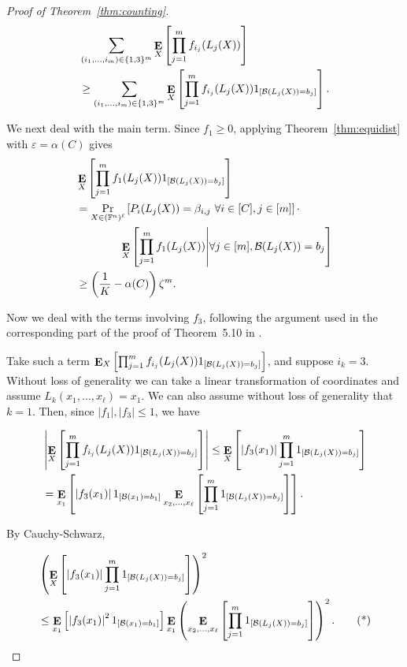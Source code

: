 \documentclass{article}
\theoremstyle{plain}
\theoremstyle{definition}
\theoremstyle{definition}
\theoremstyle{remark}
\numberwithin{equation}{section}
\newcommand{\FF}{\mathbb{F}}
\newcommand{\Esymb}{{\bf E}}
\DeclareMathOperator*{\E}{\Esymb}
\newcommand{\cB}{\mathcal B}
\begin{document}
\begin{proof}[Proof of Theorem~\ref{thm:counting}]
\begin{align*}
    & \sum_{(i_1,\dots,i_m)\in \{1,3\}^m}\E_{X}\left[\prod_{j=1}^m f_{i_j}(L_j(X))\right] \\
    & \geq\sum_{(i_1,\dots,i_m)\in \{1,3\}^m}\E_{X}\left[\prod_{j=1}^m f_{i_j}(L_j(X))1_{[\cB(L_j(X))=b_j]}\right].
\end{align*}

We next deal with the main term. Since $f_1\geq 0$, applying Theorem~\ref{thm:equidist} with $\varepsilon=\alpha(C)$ gives
\begin{align*}
    & \E_{X}\left[\prod_{j=1}^m f_{1}(L_j(X)) 1_{[\cB(L_j(X))=b_j]}\right] \\
    &= \Pr_{X\in (\FF^n)^\ell}\left[P_i(L_j(X)) = \beta_{i,j}~
 \forall i \in [C],j \in [m] \right]\cdot\\
 &\qquad \qquad \E_{X}\left[\prod_{j=1}^m f_{1}(L_j(X))\middle| \forall j\in[m], \cB(L_j(X))=b_j \right] \\
 &\geq \left(\frac{1}{K} - \alpha(C)\right) \zeta^m.
\end{align*}

Now we deal with the terms involving $f_3$, following the argument used in the corresponding part of the proof of Theorem~5.10 in \cite{VeryCountingMaybe}.

Take such a term $\E_{X}\left[\prod_{j=1}^m f_{i_j}(L_j(X))1_{[\cB(L_j(X))=b_j]}\right]$, and suppose $i_k=3$. Without loss of generality we can take a linear transformation of coordinates and assume $L_k(x_1,\dots,x_\ell)=x_1$. We can also assume without loss of generality that $k=1$. Then, since $|f_1|,|f_3|\leq 1$, we have

\begin{align*}
    &\left|\E_{X}\left[\prod_{j=1}^m f_{i_j}(L_j(X))1_{[\cB(L_j(X))=b_j]}\right]\right| \leq \E_{X}\left[ \left|f_{3}(x_1)\right|\prod_{j=1}^m 1_{[\cB(L_j(X))=b_j]}\right] \\
&=\E_{x_1}\left[\left|f_{3}(x_1)\right|1_{[\cB(x_1)=b_1]}\E_{x_2,\dots,x_\ell}\left[ \prod_{j=1}^m 1_{[\cB(L_j(X))=b_j]}\right]\right].
\end{align*}


By Cauchy-Schwarz,

\begin{align*}
    & \left(\E_{X}\left[ \left|f_{3}(x_1)\right|\prod_{j=1}^m 1_{[\cB(L_j(X))=b_j]}\right]\right)^2 \\
    & \leq \E_{x_1}\left[\left|f_{3}(x_1)\right|^2 1_{[\cB(x_1)=b_1]}\right]\E_{x_1}\left(\E_{x_2,\dots,x_\ell}\left[ \prod_{j=1}^m 1_{[\cB(L_j(X))=b_j]}\right]\right)^2.\label{eqn:csterm} \tag{*}
\end{align*}



\end{proof}
\end{document}
